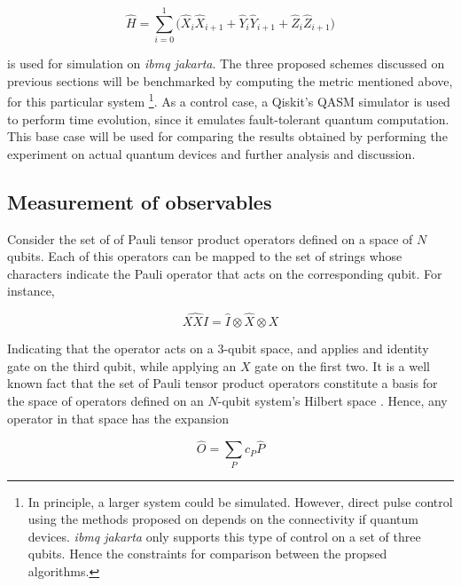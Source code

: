   \begin{equation}
    \hat{H} = \sum_{i=0}^{1}\Bigg(\hat{X}_i\hat{X}_{i+1} + \hat{Y}_i\hat{Y}_{i+1} + \hat{Z}_i\hat{Z}_{i+1} \Bigg)
    \label{eq:BenchmarkHamiltonian}
  \end{equation}

  is used for simulation on \textit{ibmq jakarta}. The three proposed schemes discussed on previous sections will be benchmarked by computing the metric mentioned above, for this particular system \footnote{In principle, a larger system could be simulated. However, direct pulse control using the methods proposed on \cite{RXZPulseEfficient} depends on the connectivity if quantum devices. \textit{ibmq jakarta} only supports this type of control on a set of three qubits. Hence the constraints for comparison between the propsed algorithms.}. As a control case, a Qiskit's QASM simulator is used to perform time evolution, since it emulates fault-tolerant quantum computation. This base case will be used for comparing the results obtained by performing the experiment on actual quantum devices and further analysis and discussion.

  \subsection{Measurement of observables}
  \label{subsec:MeasurementMethods}

    Consider the set of of Pauli tensor product operators defined on a space of $N$ qubits. Each of this operators can be mapped to the set of strings whose characters indicate the Pauli operator that acts on the corresponding qubit. For instance,

    \begin{equation}
      \hat{XXI} = \hat{I} \otimes \hat{X} \otimes{X}
    \end{equation}

    Indicating that the operator acts on a 3-qubit space, and applies and identity gate on the third qubit, while applying an $X$ gate on the first two. It is a well known fact that the set of Pauli tensor product operators constitute a basis for the space of operators defined on an $N$-qubit system's Hilbert space \cite{Nielsen, Strini}. Hence, any operator in that space has the expansion
    
    \begin{equation}
      \hat{O} = \sum_{P} c_P \hat{P}
    \end{equation}

